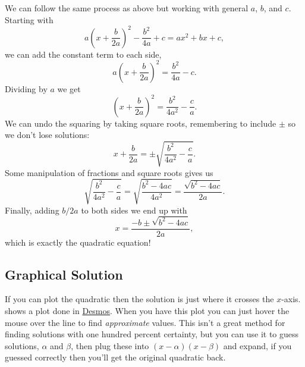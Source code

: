 \documentclass[fleqn]{LectureClass/LectureClass}
\begin{document}
    We can follow the same process as above but working with general \(a\), \(b\), and \(c\).
    Starting with 
    \begin{equation}
        a\left( x + \frac{b}{2a} \right)^2 - \frac{b^2}{4a} + c = ax^2 + bx + c,
    \end{equation}
    we can add the constant term to each side,
    \begin{equation}
        a\left( x + \frac{b}{2a} \right)^2 = \frac{b^2}{4a} - c.
    \end{equation}
    Dividing by \(a\) we get
    \begin{equation}
        \left( x + \frac{b}{2a} \right)^2 = \frac{b^2}{4a^2} - \frac{c}{a}.
    \end{equation}
    We can undo the squaring by taking square roots, remembering to include \(\pm\) so we don't lose solutions:
    \begin{equation}
        x + \frac{b}{2a} = \pm \sqrt{\frac{b^2}{4a^2} - \frac{c}{a}}.
    \end{equation}
    Some manipulation of fractions and square roots gives us
    \begin{equation}
        \sqrt{\frac{b^2}{4a^2} - \frac{c}{a}} = \sqrt{\frac{b^2 - 4ac}{4a^2}} = \frac{\sqrt{b^2 - 4ac}}{2a}.
    \end{equation}
    Finally, adding \(b/2a\) to both sides we end up with
    \begin{equation}
        x = \frac{-b \pm \sqrt{b^2 - 4ac}}{2a},
    \end{equation}
    which is exactly the quadratic equation!
    
    \subsection{Graphical Solution}
    If you can plot the quadratic then the solution is just where it crosses the \(x\)-axis.
     shows a plot done in \href{https://www.desmos.com/calculator}{Desmos}.
    When you have this plot you can just hover the mouse over the line to find \emph{approximate} values.
    This isn't a great method for finding solutions with one hundred percent certainty, but you can use it to guess solutions, \(\alpha\) and \(\beta\), then plug these into \((x - \alpha)(x - \beta)\) and expand, if you guessed correctly then you'll get the original quadratic back.
    
\end{document}
